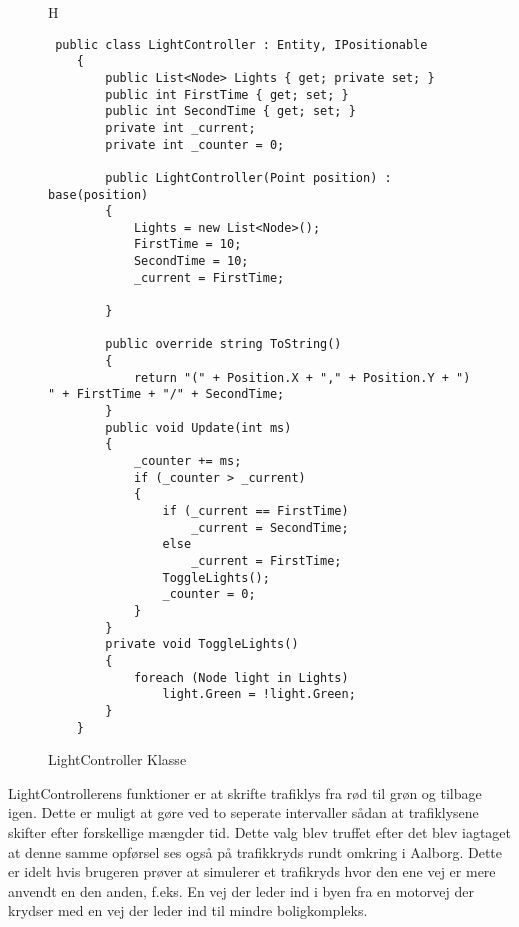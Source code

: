 \begin{figure}{H}
\begin{lstlisting}
 public class LightController : Entity, IPositionable
    {
        public List<Node> Lights { get; private set; }
        public int FirstTime { get; set; }
        public int SecondTime { get; set; }
        private int _current;
        private int _counter = 0;
        
        public LightController(Point position) : base(position)
        {
            Lights = new List<Node>();
            FirstTime = 10;
            SecondTime = 10;
            _current = FirstTime;
            
        }

        public override string ToString()
        {
            return "(" + Position.X + "," + Position.Y + ") " + FirstTime + "/" + SecondTime;
        }
        public void Update(int ms)
        {
            _counter += ms;
            if (_counter > _current)
            {
                if (_current == FirstTime)
                    _current = SecondTime;
                else
                    _current = FirstTime;
                ToggleLights();
                _counter = 0;
            }
        }
        private void ToggleLights()
        {
            foreach (Node light in Lights)
                light.Green = !light.Green;
        }
    }
\end{lstlisting}
\caption{LightController Klasse}\label{LightControllerClass}
\end{figure}

LightControllerens funktioner er at skrifte trafiklys fra rød til grøn og tilbage igen. Dette er muligt at gøre ved to seperate intervaller sådan at trafiklysene skifter efter forskellige mængder tid. Dette valg blev truffet efter det blev iagtaget at denne samme opførsel ses også på trafikkryds rundt omkring i Aalborg. Dette er idelt hvis brugeren prøver at simulerer et trafikryds hvor den ene vej er  mere anvendt en den anden, f.eks. En vej der leder ind i byen fra en motorvej der krydser med en vej der leder ind til mindre boligkompleks.
